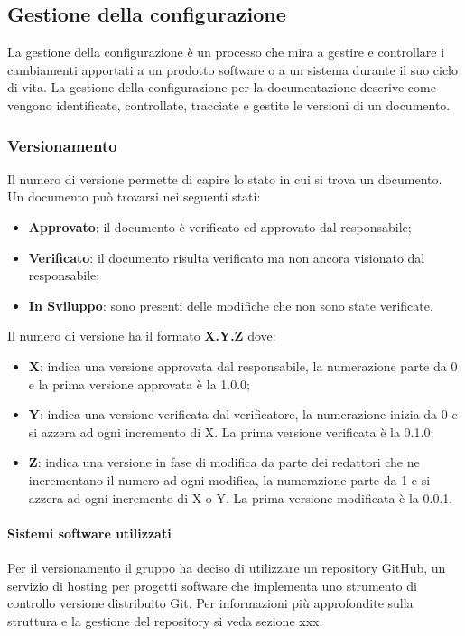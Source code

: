 \subsection{Gestione della configurazione}
La gestione della configurazione è un processo che mira a gestire e controllare i cambiamenti apportati a un prodotto software o a un sistema durante il suo ciclo di vita. 
La gestione della configurazione per la documentazione descrive come vengono identificate, controllate, tracciate e gestite le versioni di un documento.
\subsubsection{Versionamento}
Il numero di versione permette di capire lo stato in cui si trova un documento.
Un documento può trovarsi nei seguenti stati:
\begin{itemize} 
    \item \textbf{Approvato}: il documento è verificato ed approvato dal responsabile;
    \item \textbf{Verificato}: il documento risulta verificato ma non ancora visionato dal responsabile;
    \item \textbf{In Sviluppo}: sono presenti delle modifiche che non sono state verificate.
\end{itemize}
Il numero di versione ha il formato \textbf{X.Y.Z} dove:
\begin{itemize} 
    \item \textbf{X}: indica una versione approvata dal responsabile, la numerazione parte da 0
    e la prima versione approvata è la 1.0.0;
    \item \textbf{Y}: indica una versione verificata dal verificatore, la numerazione inizia da 0 e si azzera ad ogni incremento di X. La prima versione
    verificata è la 0.1.0;
    \item \textbf{Z}: indica una versione in fase di modifica da parte dei redattori che ne incrementano il numero ad ogni modifica,
    la numerazione parte da 1 e si azzera ad ogni incremento di X o Y. La prima versione modificata è la 0.0.1.
\end{itemize}

\paragraph{Sistemi software utilizzati}
Per il versionamento il gruppo ha deciso di utilizzare un repository GitHub, un servizio di hosting per progetti software che implementa uno strumento di controllo versione distribuito Git.
Per informazioni più approfondite sulla struttura e la gestione del repository si veda sezione xxx.